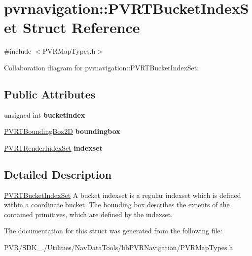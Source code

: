 \hypertarget{structpvrnavigation_1_1_p_v_r_t_bucket_index_set}{\section{pvrnavigation\+:\+:P\+V\+R\+T\+Bucket\+Index\+Set Struct Reference}
\label{structpvrnavigation_1_1_p_v_r_t_bucket_index_set}
}


{\ttfamily \#include $<$P\+V\+R\+Map\+Types.\+h$>$}



Collaboration diagram for pvrnavigation\+:\+:P\+V\+R\+T\+Bucket\+Index\+Set\+:
\subsection*{Public Attributes}
\begin{DoxyCompactItemize}
\item 
\hypertarget{structpvrnavigation_1_1_p_v_r_t_bucket_index_set_a59850563d40a5ba94a1927ce7d1c8a2f}{unsigned int {\bfseries bucketindex}}\label{structpvrnavigation_1_1_p_v_r_t_bucket_index_set_a59850563d40a5ba94a1927ce7d1c8a2f}

\item 
\hypertarget{structpvrnavigation_1_1_p_v_r_t_bucket_index_set_a988e549dfbf7b1905b0eb2386838bf71}{\hyperlink{structpvrnavigation_1_1_p_v_r_t_bounding_box2_d}{P\+V\+R\+T\+Bounding\+Box2\+D} {\bfseries boundingbox}}\label{structpvrnavigation_1_1_p_v_r_t_bucket_index_set_a988e549dfbf7b1905b0eb2386838bf71}

\item 
\hypertarget{structpvrnavigation_1_1_p_v_r_t_bucket_index_set_a9ff07ee224b0c45657d5ea0405b7c09a}{\hyperlink{structpvrnavigation_1_1_p_v_r_t_render_index_set}{P\+V\+R\+T\+Render\+Index\+Set} {\bfseries indexset}}\label{structpvrnavigation_1_1_p_v_r_t_bucket_index_set_a9ff07ee224b0c45657d5ea0405b7c09a}

\end{DoxyCompactItemize}


\subsection{Detailed Description}


  \hyperlink{structpvrnavigation_1_1_p_v_r_t_bucket_index_set}{P\+V\+R\+T\+Bucket\+Index\+Set}  A bucket indexset is a regular indexset which is defined within a coordinate bucket. The bounding box describes the extents of the contained primitives, which are defined by the indexset. 

The documentation for this struct was generated from the following file\+:\begin{DoxyCompactItemize}
\item 
P\+V\+R/\+S\+D\+K\+\_./\+Utilities/\+Nav\+Data\+Tools/lib\+P\+V\+R\+Navigation/P\+V\+R\+Map\+Types.\+h\end{DoxyCompactItemize}
